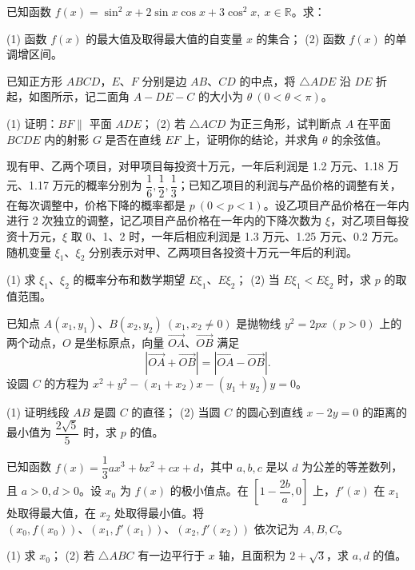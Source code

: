 \begin{question}
已知函数 $f(x)=\sin^2x+2\sin x\cos x+3\cos^2x,\ x\in\mathbb R$。求：

(1) 函数 $f(x)$ 的最大值及取得最大值的自变量 $x$ 的集合；
(2) 函数 $f(x)$ 的单调增区间。

\Needspace{0.4\textheight}
\end{question}
\begin{question}
已知正方形 $ABCD$，$E\text{、}F$ 分别是边 $AB\text{、}CD$ 的中点，将 $\triangle ADE$ 沿 $DE$ 折起，如图所示，记二面角 $A-DE-C$ 的大小为 $\theta\ (0<\theta<\pi)$。

(1) 证明：$BF\parallel$ 平面 $ADE$；
(2) 若 $\triangle ACD$ 为正三角形，试判断点 $A$ 在平面 $BCDE$ 内的射影 $G$ 是否在直线 $EF$ 上，证明你的结论，并求角 $\theta$ 的余弦值。
\nopagebreak[4]
\begin{center}\end{center}
\nopagebreak[4]
\end{question}
\begin{question}
现有甲、乙两个项目，对甲项目每投资十万元，一年后利润是 1.2 万元、1.18 万元、1.17 万元的概率分别为 $\dfrac16,\dfrac12,\dfrac13$；已知乙项目的利润与产品价格的调整有关，在每次调整中，价格下降的概率都是 $p\ (0<p<1)$。设乙项目产品价格在一年内进行 2 次独立的调整，记乙项目产品价格在一年内的下降次数为 $\xi$，对乙项目每投资十万元，$\xi$ 取 0、1、2 时，一年后相应利润是 1.3 万元、1.25 万元、0.2 万元。随机变量 $\xi_1\text{、}\xi_2$ 分别表示对甲、乙两项目各投资十万元一年后的利润。

(1) 求 $\xi_1\text{、}\xi_2$ 的概率分布和数学期望 $E\xi_1\text{、}E\xi_2$；
(2) 当 $E\xi_1<E\xi_2$ 时，求 $p$ 的取值范围。

\end{question}
\begin{question}
已知点 $A(x_1,y_1)\text{、}B(x_2,y_2)\ (x_1,x_2\ne0)$ 是抛物线 $y^2=2px\ (p>0)$ 上的两个动点，$O$ 是坐标原点，向量 $\overrightarrow{OA}\text{、}\overrightarrow{OB}$ 满足
\nopagebreak[4]
\[
|\overrightarrow{OA}+\overrightarrow{OB}|=|\overrightarrow{OA}-\overrightarrow{OB}|.
\]
设圆 $C$ 的方程为 $x^2+y^2-(x_1+x_2)x-(y_1+y_2)y=0$。

(1) 证明线段 $AB$ 是圆 $C$ 的直径；
(2) 当圆 $C$ 的圆心到直线 $x-2y=0$ 的距离的最小值为 $\dfrac{2\sqrt5}{5}$ 时，求 $p$ 的值。

\end{question}
\begin{question}
已知函数 $f(x)=\dfrac13 ax^3+bx^2+cx+d$，其中 $a,b,c$ 是以 $d$ 为公差的等差数列，且 $a>0,d>0$。设 $x_0$ 为 $f(x)$ 的极小值点。在 $[1-\dfrac{2b}{a},0]$ 上，$f'(x)$ 在 $x_1$ 处取得最大值，在 $x_2$ 处取得最小值。将 $(x_0,f(x_0))\text{、}(x_1,f'(x_1))\text{、}(x_2,f'(x_2))$ 依次记为 $A,B,C$。

(1) 求 $x_0$；
(2) 若 $\triangle ABC$ 有一边平行于 $x$ 轴，且面积为 $2+\sqrt3$，求 $a,d$ 的值。

\end{question}
